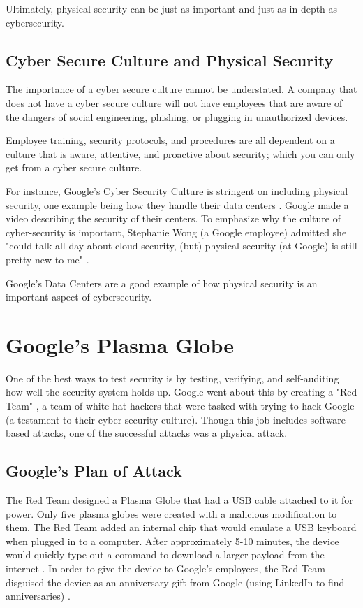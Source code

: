 \documentclass[acmsmall]{acmart}
\begin{document}
Ultimately, physical security can be just as important and just as in-depth
as cybersecurity.

\subsection{Cyber Secure Culture and Physical Security}
The importance of a cyber secure culture cannot be understated. A company
that does not have a cyber secure culture will not have employees that
are aware of the dangers of social engineering, phishing, or plugging in
unauthorized devices.

Employee training, security protocols, and procedures are all dependent
on a culture that is aware, attentive, and proactive about security;
which you can only get from a cyber secure culture.

For instance, Google's Cyber Security Culture is stringent on including
physical security, one example being how they handle their data centers \cite{GoogleData}.
Google made a video describing the security of their centers. To emphasize why
the culture of cyber-security is important,
Stephanie Wong (a Google employee) admitted she "could talk all day
about cloud security, (but) physical security (at Google) is still pretty new to me" \cite{GoogleDataVideo}.

Google's Data Centers are a good example of how physical security is an important
aspect of cybersecurity.

\section{Google's Plasma Globe}
One of the best ways to test security is by testing, verifying, and self-auditing
how well the security system holds up. Google went about this by creating a
"Red Team" \cite{GoogleRedTeamBlog}, a team of white-hat hackers that were tasked with
trying to hack Google (a testament to their cyber-security culture).
Though this job includes software-based attacks,
one of the successful attacks was a physical attack.

\subsection{Google's Plan of Attack}
The Red Team designed a Plasma Globe that had a USB cable attached to it for power.
Only five plasma globes were created with a malicious modification to them.
The Red Team added an internal chip that would emulate a USB keyboard when plugged
in to a computer. After approximately 5-10 minutes, the device would
quickly type out a command to download a larger payload from the internet \cite{GoogleGlobeBlog}.
In order to give the device to Google's employees, the Red Team disguised the
device as an anniversary gift from Google (using LinkedIn to find anniversaries) \cite{GoogleGlobeVideo}.
\end{document}
